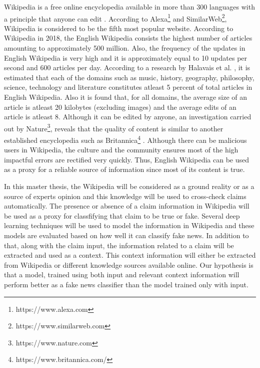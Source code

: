 \documentclass[a4paper, 11pt]{article}
\begin{document}
Wikipedia is a free online encyclopedia available in more than 300 languages with a principle that anyone can edit \cite{Wales2005}. According to Alexa\footnote{https://www.alexa.com} and SimilarWeb\footnote{https://www.similarweb.com}, Wikipedia is considered to be the fifth most popular website. According to Wikipedia in 2018, the English Wikipedia consists the highest number of articles amounting to approximately 500 million. Also, the frequency of the updates in English Wikipedia is very high and it is approximately equal to 10 updates per second and 600 articles per day. According to a research by Halavais et al. \cite{Halavais2008}, it is estimated that each of the domains such as music, history, geography, philosophy, science, technology and literature constitutes atleast 5 percent of total articles in English Wikipedia. Also it is found that, for all domains, the average size of an article is atleast 20 kilobytes (excluding images) and the average edits of an article is atleast 8. Although it can be edited by anyone, an investigation carried out by Nature\footnote{https://www.nature.com}, reveals that the quality of content is similar to another established encyclopedia such as Britannica\footnote{https://www.britannica.com/} \cite{Wales2005}. Although there can be malicious users in Wikipedia, the culture and the community ensures most of the high impactful errors are rectified very quickly\cite{Priedhorsky2007}. Thus, English Wikipedia can be used as a proxy for a reliable source of information since most of its content is true.
 
In this master thesis, the Wikipedia will be considered as a ground reality or as a source of experts opinion and this knowledge will be used to cross-check claims automatically. The presence or absence of a claim information in Wikipedia will be used as a proxy for classfifying that claim to be true or fake. Several deep learning techniques \cite{Goodfellow2016} will be used to model the information in Wikipedia and these models are evaluated based on how well it can classify fake news. In addition to that, along with the claim input, the information related to a claim will be extracted and used as a context. This context information will either be extracted from Wikipedia or different knowledge sources available online.\color{red} Our hypothesis is that a model, trained using both input and relevant context information will perform better as a fake news classifier than the model trained only with input.\color{black}
\end{document}
